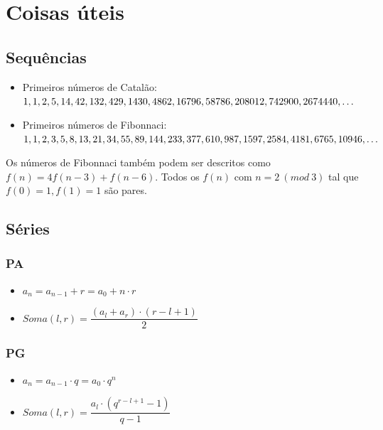 
    \section{Coisas úteis}
    \subsection{Sequências}
        \begin{itemize}
            \item Primeiros números de Catalão: $1, 1, 2, 5, 14, 42, 132, 429, 1430, 4862, 16796, 58786, 208012, \\ 742900, 2674440, \dots$
            \item Primeiros números de Fibonnaci: $1, 1, 2, 3, 5, 8, 13, 21, 34, 55, 89, 144, 233, 377, 610, 987, 1597, 2584,  \\ 4181, 6765, 10946, \dots$
        \end{itemize}
        Os números de Fibonnaci também podem ser descritos como $f(n) = 4f(n-3) + f(n-6)$. Todos os $f(n)$ com $n = 2 ~(mod~3)$ tal que $f(0) = 1, f(1) = 1$ são pares.
    \subsection{Séries}
        \begin{minipage}{.48\textwidth}
        \subsubsection{PA}
            \begin{itemize}
                \item $a_n = a_{n-1} + r = a_0 + n \cdot r$
                \item $Soma(l,r) = \dfrac{(a_l + a_r) \cdot (r-l+1)}{2}$
            \end{itemize}
        \end{minipage}
        \begin{minipage}{.48\textwidth}
        \subsubsection{PG}
            \begin{itemize}
                \item $a_n = a_{n-1} \cdot  q = a_0 \cdot q^n$
                \item $Soma(l,r) = \dfrac{a_l \cdot  (q^{r-l+1} - 1)}{q-1}$
            \end{itemize}
        \end{minipage}
